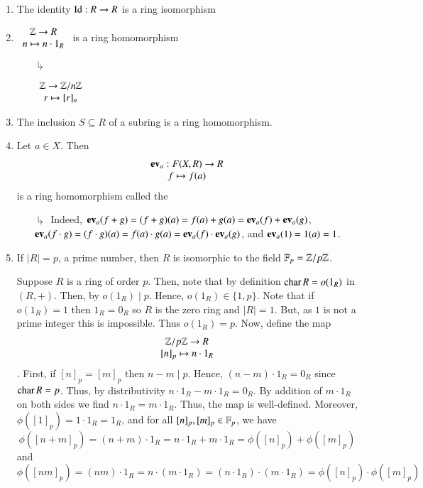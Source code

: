 \documentclass[12pt, a4paper, twoside, openright, titlepage]{book}
\begin{document}
\begin{eg}{}{}
    \leavevmode
    \begin{enumerate}
        \item The identity $\operatorname{Id}:R \rightarrow R$ is a ring isomorphism
        \item $\begin{array}{c} \mathbb Z\rightarrow R \\ n\mapsto n\cdot 1_R \end{array}$ is a ring homomorphism
        \begin{enumerate}
            \item[$\drsh$] \begin{eg}{}{}
                $\begin{array}{c} \mathbb Z\rightarrow \mathbb Z/n\mathbb Z \\ r \mapsto [r]_n \end{array}$
            \end{eg} 
        \end{enumerate}
        \item The inclusion $S \subseteq R$ of a subring is a ring homomorphism.
        \item Let $a \in X$. Then \begin{equation}
            \begin{array}{c} \operatorname{\bf{ev}}_a:F(X,R)\rightarrow R \\ f\mapsto f(a) \end{array}
        \end{equation}
        is a ring homomorphism called the 
        \begin{enumerate}
            \item[$\drsh$] Indeed, $\operatorname{\bf{ev}}_a(f+g) = (f+g)(a) = f(a)+g(a) = \operatorname{\bf{ev}}_a(f) + \operatorname{\bf{ev}}_a(g)$, $\operatorname{\bf{ev}}_a(f\cdot g) = (f\cdot g)(a) = f(a)\cdot g(a) = \operatorname{\bf{ev}}_a(f)\cdot \operatorname{\bf{ev}}_a(g)$, and $\operatorname{\bf{ev}}_a(1) = 1(a) = 1$.
        \end{enumerate}
        \item If $|R| = p$, a prime number, then $R$ is isomorphic to the field $\mathbb F_p = \mathbb Z/p\mathbb Z$.
        \begin{proof*}{}{}
            Suppose $R$ is a ring of order $p$. Then, note that by definition $\operatorname{char} R = o(1_R)$ in $(R,+)$. Then, by  $o(1_R)\;\vert\;p$. Hence, $o(1_R) \in \{1,p\}$. Note that if $o(1_R) = 1$ then $1_R = 0_R$ so $R$ is the zero ring and $|R| = 1$. But, as $1$ is not a prime integer this is impossible. Thus $o(1_R) = p$. Now, define the map $$\begin{array}{c} \mathbb Z/p\mathbb Z\rightarrow R \\  {[n]}_p \mapsto n\cdot 1_R \end{array}$$. First, if $[n]_p = [m]_p$ then $n - m\;\vert\;p$. Hence, $(n-m)\cdot 1_R = 0_R$ since $\operatorname{char} R = p$. Thus, by distributivity $n\cdot 1_R -m\cdot 1_R = 0_R$. By addition of $m\cdot 1_R$ on both sides we find $n\cdot 1_R = m\cdot 1_R$. Thus, the map is well-defined. Moreover, $\phi([1]_p) = 1\cdot 1_R = 1_R$, and for all $[n]_p,[m]_p \in \mathbb F_p$, we have $$\phi([n+m]_p) = (n+m)\cdot1_R = n\cdot1_R + m\cdot1_R = \phi([n]_p) + \phi([m]_p)$$ and $$\phi([nm]_p) = (nm)\cdot1_R = n\cdot(m\cdot1_R) = (n\cdot 1_R)\cdot(m\cdot1_R) = \phi([n]_p)\cdot \phi([m]_p)$$

\end{proof*}
\end{enumerate}
\end{eg}
\end{document}
